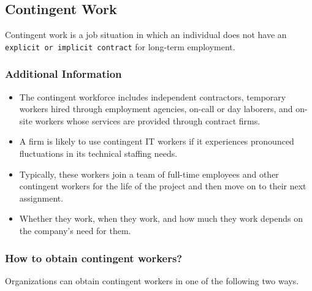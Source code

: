 \documentclass[11pt]{article}
\begin{document}
\subsection{Contingent Work}
\label{sec:orgce436f8}
Contingent work is a job situation in which an individual does not have an \texttt{explicit or implicit contract} for long-term employment.
\subsubsection{Additional Information}
\label{sec:orgd1f9c54}
\begin{itemize}
\item The contingent workforce includes independent contractors, temporary workers hired through employment agencies, on-call or day laborers, and on-site workers whose services are provided through contract firms.
\item A firm is likely to use contingent IT workers if it experiences pronounced fluctuations in its technical staffing needs.
\item Typically, these workers join a team of full-time employees and other contingent workers for the life of the project and then move on to their next assignment.
\item Whether they work, when they work, and how much they work depends on the company’s need for them.
\end{itemize}
\subsubsection{How to obtain contingent workers?}
\label{sec:orgb693e9c}
Organizations can obtain contingent workers in one of the following two ways.
\end{document}
